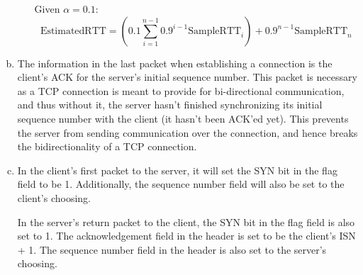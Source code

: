 \documentclass[11pt]{article}
\begin{document}
\begin{enumerate}[(a)]
\begin{enumerate}[(i)]
          Given $\alpha = 0.1$:
          \[ \text{EstimatedRTT} = \left( 0.1 \sum^{n-1}_{i=1} 0.9^{i-1} \text{SampleRTT}_i \right) + 0.9^{n-1} \text{SampleRTT}_n \]
      \end{enumerate}
    \item
      The information in the last packet when establishing a connection is the
      client's ACK for the server's initial sequence number. This packet is necessary
      as a TCP connection is meant to provide for bi-directional communication, and thus
      without it, the server hasn't finished synchronizing its initial sequence number
      with the client  (it hasn't been ACK'ed yet). This prevents the server from sending
      communication over the connection, and hence breaks the bidirectionality of
      a TCP connection.
    \item
      In the client's first packet to the server, it will set the SYN bit in the flag
      field to be 1. Additionally, the sequence number field will also be set
      to the client's choosing.

      In the server's return packet to the client, the SYN bit in the flag field
      is also set to 1. The acknowledgement field in the header is set to be
      the client's ISN + 1. The sequence number field in the header is also
      set to the server's choosing.


\end{enumerate}
\end{document}
